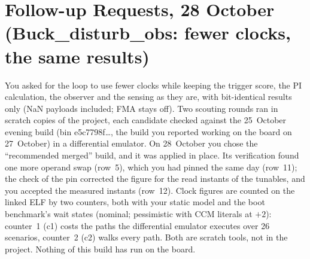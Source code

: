 \documentclass[11pt]{article}
\begin{document}
\section{Follow-up Requests, 28 October (Buck\_disturb\_obs: fewer clocks, the same results)}
\label{sec:followup1028}

You asked for the loop to use fewer clocks while keeping the trigger
score, the PI calculation, the observer and the sensing as they are,
with bit-identical results only (NaN payloads included; FMA stays off).
Two scouting rounds ran in scratch copies of the project, each candidate
checked against the 25~October evening build (bin e5c7798f\ldots, the
build you reported working on the board on 27~October) in a differential
emulator. On 28~October you chose the ``recommended merged'' build, and it
was applied in place. Its verification found one more operand swap (row~5),
which you had pinned the same day (row~11); the check of the pin corrected the
figure for the read instants of the tunables, and you accepted the measured
instants (row~12). Clock figures are counted on the linked ELF by two
counters, both with your static model and the boot benchmark's wait states
(nominal; pessimistic with CCM literals at $+2$): counter~1 (c1) costs the
paths the differential emulator executes over 26 scenarios, counter~2 (c2)
walks every path. Both are scratch tools, not in the project. Nothing of
this build has run on the board.
\end{document}
